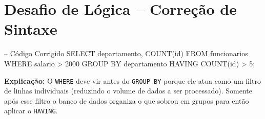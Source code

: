 \documentclass[12pt]{article}
\begin{document}
\section*{Desafio de Lógica – Correção de Sintaxe}



\begin{sqlcode}
-- Código Corrigido
SELECT departamento, COUNT(id)
FROM funcionarios
WHERE salario > 2000
GROUP BY departamento
HAVING COUNT(id) > 5;
\end{sqlcode}

\textbf{Explicação:} O \texttt{WHERE} deve vir antes do \texttt{GROUP BY} porque ele atua como um filtro de linhas individuais (reduzindo o volume de dados a ser processado). Somente após esse filtro o banco de dados organiza o que sobrou em grupos para então aplicar o \texttt{HAVING}.
\end{document}
